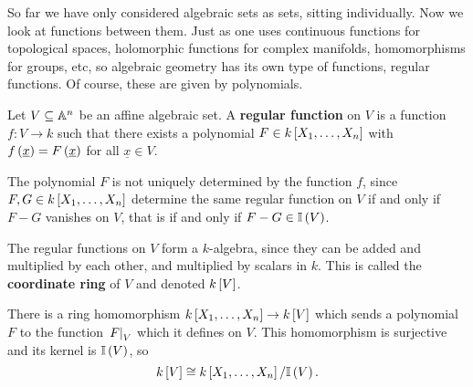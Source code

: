 
So far we have only considered algebraic sets as sets, sitting individually. Now we look at functions between them. Just as one uses continuous functions for topological spaces, holomorphic functions for complex manifolds, homomorphisms for groups, etc, so algebraic geometry has its own type of functions, regular functions. Of course, these are given by polynomials.

\begin{definition*}
Let $ V \subseteq \AA^n $ be an affine algebraic set. A \textbf{regular function} on $ V $ is a function $ f : V \to k $ such that there exists a polynomial $ F \in k\sbr{X_1, \dots, X_n} $ with $ f\br{\underline{x}} = F\br{\underline{x}} $ for all $ \underline{x} \in V $.
\end{definition*}

\begin{note*}
The polynomial $ F $ is not uniquely determined by the function $ f $, since $ F, G \in k\sbr{X_1, \dots, X_n} $ determine the same regular function on $ V $ if and only if $ F - G $ vanishes on $ V $, that is if and only if $ F - G \in \II\br{V} $.
\end{note*}

\begin{definition*}
The regular functions on $ V $ form a $ k $-algebra, since they can be added and multiplied by each other, and multiplied by scalars in $ k $. This is called the \textbf{coordinate ring} of $ V $ and denoted $ k\sbr{V} $.
\end{definition*}

There is a ring homomorphism $ k\sbr{X_1, \dots, X_n} \to k\sbr{V} $ which sends a polynomial $ F $ to the function $ \eval{F}_V $ which it defines on $ V $. This homomorphism is surjective and its kernel is $ \II\br{V} $, so
$$ k\sbr{V} \cong k\sbr{X_1, \dots, X_n} / \II\br{V}. $$

